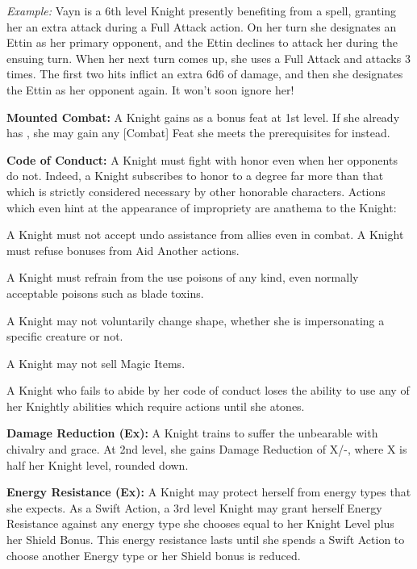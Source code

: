 \textit{Example:} Vayn is a 6th level Knight presently benefiting from a  spell, granting her an extra attack during a Full Attack action. On her turn she designates an Ettin as her primary opponent, and the Ettin declines to attack her during the ensuing turn. When her next turn comes up, she uses a Full Attack and attacks 3 times. The first two hits inflict an extra 6d6 of damage, and then she designates the Ettin as her opponent again. It won't soon ignore her!

\textbf{Mounted Combat:} A Knight gains  as a bonus feat at 1st level. If she already has , she may gain any [Combat] Feat she meets the prerequisites for instead.

\textbf{Code of Conduct:} A Knight must fight with honor even when her opponents do not. Indeed, a Knight subscribes to honor to a degree far more than that which is strictly considered necessary by other honorable characters. Actions which even hint at the appearance of impropriety are anathema to the Knight:

\begin{itemize*}
\item A Knight must not accept undo assistance from allies even in combat. A Knight must refuse bonuses from Aid Another actions.
\item A Knight must refrain from the use poisons of any kind, even normally acceptable poisons such as blade toxins.
\item A Knight may not voluntarily change shape, whether she is impersonating a specific creature or not.
\item A Knight may not sell Magic Items.
\end{itemize*}

A Knight who fails to abide by her code of conduct loses the ability to use any of her Knightly abilities which require actions until she atones.

\textbf{Damage Reduction (Ex):} A Knight trains to suffer the unbearable with chivalry and grace. At 2nd level, she gains Damage Reduction of X/-, where X is half her Knight level, rounded down.

\textbf{Energy Resistance (Ex):} A Knight may protect herself from energy types that she expects. As a Swift Action, a 3rd level Knight may grant herself Energy Resistance against any energy type she chooses equal to her Knight Level plus her Shield Bonus. This energy resistance lasts until she spends a Swift Action to choose another Energy type or her Shield bonus is reduced.

